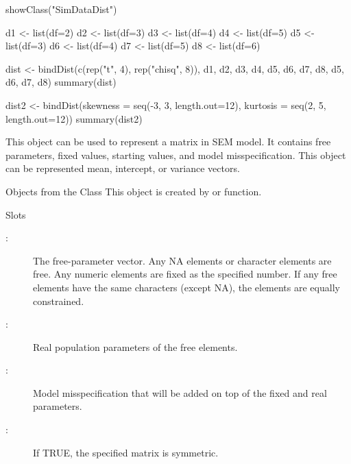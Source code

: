 \documentclass[a4paper]{book}
\begin{document}
%
\begin{Examples}
\begin{ExampleCode}
showClass("SimDataDist")

d1 <- list(df=2)
d2 <- list(df=3)
d3 <- list(df=4)
d4 <- list(df=5)
d5 <- list(df=3)
d6 <- list(df=4)
d7 <- list(df=5)
d8 <- list(df=6)

dist <- bindDist(c(rep("t", 4), rep("chisq", 8)), d1, d2, d3, d4, d5, d6, d7, d8, d5, d6, d7, d8)
summary(dist)

dist2 <- bindDist(skewness = seq(-3, 3, length.out=12), kurtosis = seq(2, 5, length.out=12))
summary(dist2)
\end{ExampleCode}
\end{Examples}
%
\begin{Description}\relax
This object can be used to represent a matrix in SEM model. It contains free parameters, fixed values, starting values, and model misspecification. This object can be represented mean, intercept, or variance vectors.
\end{Description}
%
\begin{Section}{Objects from the Class}
This object is created by  or  function. 
\end{Section}
%
\begin{Section}{Slots}
\begin{description}

\item[:]  The free-parameter vector. Any NA elements or character elements are free. Any numeric elements are fixed as the specified number. If any free elements have the same characters (except NA), the elements are equally constrained. 
\item[:]  Real population parameters of the free elements. 
\item[:]  Model misspecification that will be added on top of the fixed and real parameters. 
\item[:]  If TRUE, the specified matrix is symmetric. 


\end{description}

\end{Section}
\end{document}
